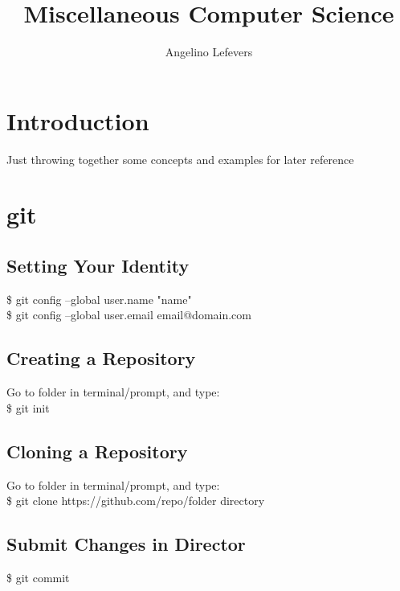 \documentclass{article}
\begin{document}
\title{Miscellaneous Computer Science}
\author{Angelino Lefevers}
\maketitle
\thispagestyle{empty}
\cleardoublepage
\tableofcontents
\thispagestyle{empty}
\cleardoublepage
\setcounter{page}{1}
\section{Introduction}
Just throwing together some concepts and examples for later reference
\cleardoublepage
\section{git}
\subsection{Setting Your Identity}
\$ git config --global user.name "name"\\
\$ git config --global user.email email@domain.com

\subsection{Creating a Repository}
Go to folder in terminal/prompt, and type:\\
\$ git init

\subsection{Cloning a Repository}
Go to folder in terminal/prompt, and type:\\
\$ git clone https://github.com/repo/folder directory

\subsection{Submit Changes in Director}
\$ git commit

\end{document}
